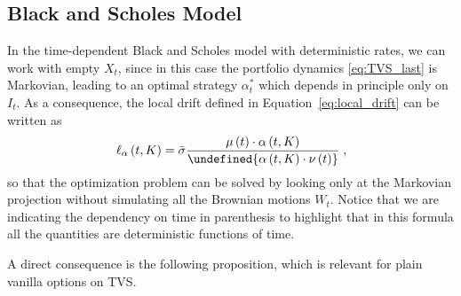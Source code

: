 \documentclass[11pt]{article}
\let\norm\undefined %
\DeclarePairedDelimiter\norm{\lVert}{\rVert}
\begin{document}
\subsection{Black and Scholes Model}\label{subsec:BS_model}
In the time-dependent Black and Scholes model with deterministic rates, we can work with empty $X_t$, since in this case the portfolio dynamics \eqref{eq:TVS_last} is Markovian, leading to an optimal strategy $\alpha_t^*$ which depends in principle only on $I_t$. As a consequence, the local drift defined in Equation~\eqref{eq:local_drift} can be written as
\begin{equation}
     \ell_\alpha \left(t,K\right) = \bar{\sigma}   \frac{\mu\left(t\right) \cdot \alpha\left(t,K\right)}{\norm{\alpha\left(t,K\right) \cdot \nu\left(t\right)}} \; ,  
\end{equation}
so that the optimization problem can be solved by looking only at the Markovian projection without simulating all the Brownian motions $W_t$. Notice that we are indicating the dependency on time in parenthesis to highlight that in this formula all the quantities are deterministic functions of time.

A direct consequence is the following proposition, which is relevant for plain vanilla options on TVS.
\end{document}
